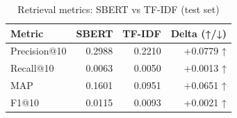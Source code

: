 \begin{table}[htbp]
\centering
\caption{Retrieval metrics: SBERT vs TF-IDF (test set)}
\label{tab:retrieval_metrics}
\begin{tabular}{lrrr}
\toprule
Metric & SBERT & TF-IDF & Delta (↑/↓) \\
\midrule
Precision@10 & 0.2988 & 0.2210 & +0.0779 ↑ \\
Recall@10 & 0.0063 & 0.0050 & +0.0013 ↑ \\
MAP & 0.1601 & 0.0951 & +0.0651 ↑ \\
F1@10 & 0.0115 & 0.0093 & +0.0021 ↑ \\
\bottomrule
\end{tabular}
\end{table}
